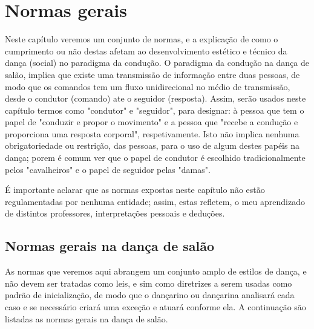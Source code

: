 
\chapter{Normas gerais}
Neste capítulo veremos um conjunto de normas, e a explicação de como o cumprimento
ou não destas afetam ao desenvolvimento estético e técnico da dança (social) no paradigma 
da condução. 
O paradigma da condução na dança de salão, implica que existe uma transmissão de informação
entre duas pessoas, de modo que os comandos tem um fluxo unidirecional no médio de transmissão,
desde o condutor (comando) ate o seguidor (resposta). 
Assim, serão usados neste capítulo termos como "condutor" e "seguidor", 
para designar: à pessoa que tem o papel de "conduzir e propor o movimento" 
e a pessoa que "recebe a condução e proporciona uma resposta corporal", respetivamente.
Isto não implica nenhuma obrigatoriedade ou restrição, das pessoas, para o uso de algum destes papéis na dança;
porem é comum ver que o papel de condutor é escolhido tradicionalmente pelos "cavalheiros" e o papel de seguidor pelas "damas".
\begin{lattention}
É importante aclarar
que as normas expostas neste capítulo não estão regulamentadas por nenhuma entidade; assim, estas
refletem, o meu aprendizado de distintos professores,
interpretações pessoais  e deduções. 
\end{lattention}

\section{Normas gerais na dança de salão}
As normas que veremos aqui abrangem um conjunto amplo de estilos de 
dança, e não devem ser
tratadas como leis, e sim como diretrizes a serem usadas como padrão de inicialização, de modo que 
o dançarino ou dançarina analisará cada caso e se necessário criará uma exceção e atuará conforme ela.
A continuação são listadas as normas gerais na dança de salão.\\

